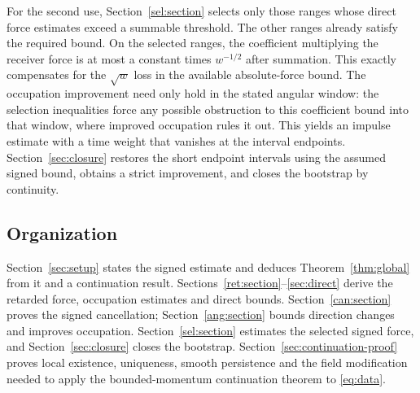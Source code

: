 For the second use, Section~\ref{sel:section} selects only those ranges
whose direct force estimates exceed a summable threshold. The other
ranges already satisfy the required bound. On the selected ranges, the
coefficient multiplying the receiver force is at most a constant times
$w^{-1/2}$ after summation. This exactly compensates for the $\sqrt w$
loss in the available absolute-force bound. The occupation improvement
need only hold in the stated angular window: the selection inequalities
force any possible obstruction to this coefficient bound into that
window, where improved occupation rules it out. This yields an impulse
estimate with a time weight that vanishes at the interval endpoints.
Section~\ref{sec:closure}
restores the short endpoint intervals using the assumed signed bound,
obtains a strict improvement, and closes the bootstrap by continuity.

\subsection{Organization}
Section~\ref{sec:setup} states the signed estimate and deduces
Theorem~\ref{thm:global} from it and a continuation result.
Sections~\ref{ret:section}--\ref{sec:direct} derive the retarded force,
occupation estimates and direct bounds.
Section~\ref{can:section} proves the signed cancellation;
Section~\ref{ang:section} bounds direction changes and improves occupation.
Section~\ref{sel:section} estimates the selected signed force, and
Section~\ref{sec:closure} closes the bootstrap.
Section~\ref{sec:continuation-proof} proves local existence, uniqueness,
smooth persistence and the field modification needed to apply the bounded-momentum
continuation theorem to \eqref{eq:data}.
